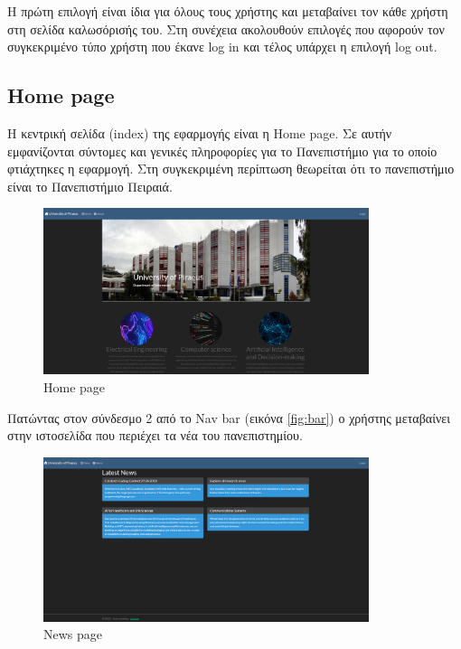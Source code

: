 \documentclass[12pt]{article}
\begin{document}
	Η πρώτη επιλογή είναι ίδια για όλους τους χρήστης και μεταβαίνει τον κάθε χρήστη στη σελίδα καλωσόρισής του. Στη συνέχεια ακολουθούν επιλογές που αφορούν τον συγκεκριμένο τύπο χρήστη που έκανε log in και τέλος υπάρχει η επιλογή log out.
	
	
	\subsection{Home page}
	
	Η κεντρική σελίδα (index) της εφαρμογής είναι η Home page. Σε αυτήν εμφανίζονται σύντομες και γενικές πληροφορίες για το Πανεπιστήμιο για το οποίο φτιάχτηκες η εφαρμογή. Στη συγκεκριμένη περίπτωση θεωρείται ότι το πανεπιστήμιο είναι το Πανεπιστήμιο Πειραιά. 
	
	\begin{figure}[H]
		\centering
		\includegraphics[width=0.85\textwidth]{homes3.png}
		\caption{Home page}
		\label{fig:homes}
	\end{figure}
	
	
	Πατώντας στον σύνδεσμο 2 από το Nav bar (εικόνα \ref{fig:bar}) ο χρήστης μεταβαίνει στην ιστοσελίδα που περιέχει τα νέα του πανεπιστημίου.
	
	\begin{figure}[H]
		\centering
		\includegraphics[width=0.85\textwidth]{news.png}
		\caption{News page}
		\label{fig:emptyView}
	\end{figure}
	
\end{document}
